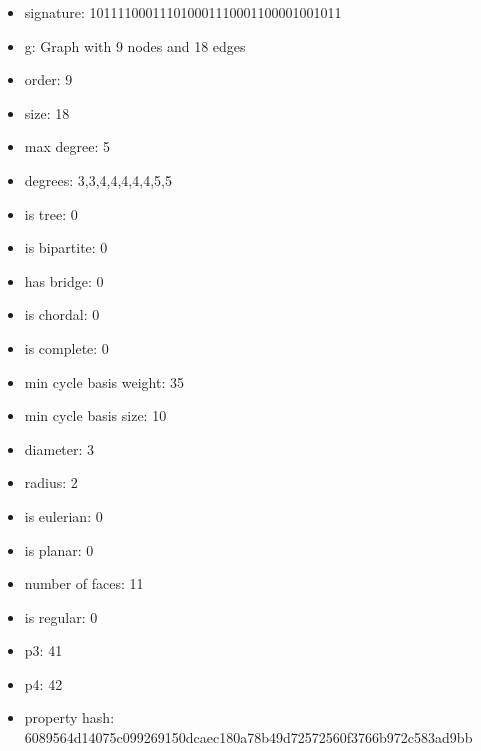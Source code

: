 \newpage
\begin{figure}
\end{figure}
\begin{itemize}
\item signature: 101111000111010001110001100001001011
\item g: Graph with 9 nodes and 18 edges
\item order: 9
\item size: 18
\item max degree: 5
\item degrees: 3,3,4,4,4,4,4,5,5
\item is tree: 0
\item is bipartite: 0
\item has bridge: 0
\item is chordal: 0
\item is complete: 0
\item min cycle basis weight: 35
\item min cycle basis size: 10
\item diameter: 3
\item radius: 2
\item is eulerian: 0
\item is planar: 0
\item number of faces: 11
\item is regular: 0
\item p3: 41
\item p4: 42
\item property hash: 6089564d14075c099269150dcaec180a78b49d72572560f3766b972c583ad9bb
\end{itemize}
